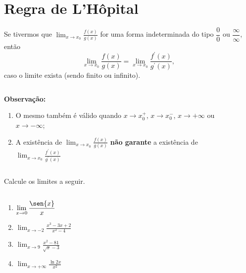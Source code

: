 \section{Regra de L'Hôpital}

\begin{frame}
  \begin{theorem}
    Se tivermos que $\displaystyle\lim_{x\to x_{0}}\frac{f(x)}{g(x)}$ for uma forma indeterminada do tipo $\dfrac{0}{0}$ ou $\dfrac{\infty}{\infty}$, então
    \begin{equation*}
      \lim_{x\to x_{0}}\frac{f(x)}{g(x)} = \lim_{x\to x_{0}}\frac{f^{\prime}(x)}{g^{\prime}(x)},
    \end{equation*}
    caso o limite exista (sendo finito ou infinito).
  \end{theorem}
  \begin{columns}[onlytextwidth]
    \begin{column}{0.5\textwidth}
      \begin{highlight}
        \textbf{Observação:}
        \begin{enumerate}
          \item O mesmo também é válido quando $x\to x_{0}^{+}$, $x\to x_{0}^{-}$, $x\to +\infty$ ou $x\to -\infty$;
          \item A existência de $\displaystyle \lim_{x\to x_{0}}\frac{f(x)}{g(x)}$ \textbf{não garante} a existência de $\displaystyle \lim_{x\to x_{0}}\frac{f^{\prime}(x)}{g^{\prime}(x)}$\vspace*{-0.2cm}
        \end{enumerate}
      \end{highlight}
    \end{column}
    \begin{column}{0.5\textwidth}
    \end{column}
  \end{columns}
\end{frame}

\begin{frame}
  \begin{example}
    Calcule os limites a seguir.
  \end{example}
  \begin{columns}[onlytextwidth]
    \begin{column}{0.5\textwidth}
      \begin{enumerate}
        \item $\displaystyle\lim_{x\to 0}\frac{\sen{x}}{x}$
        \item $\displaystyle\lim_{x\to -2}\frac{x^{3}-3x+2}{x^{2}-4}$
        \item $\displaystyle\lim_{x\to 9}\frac{x^{2}-81}{\sqrt{x}-3}$
        \item $\displaystyle\lim_{x\to +\infty}\frac{\ln{2x}}{x^{2}}$
      \end{enumerate}
    \end{column}
    \begin{column}{0.5\textwidth}
    \end{column}
  \end{columns}
\end{frame}

